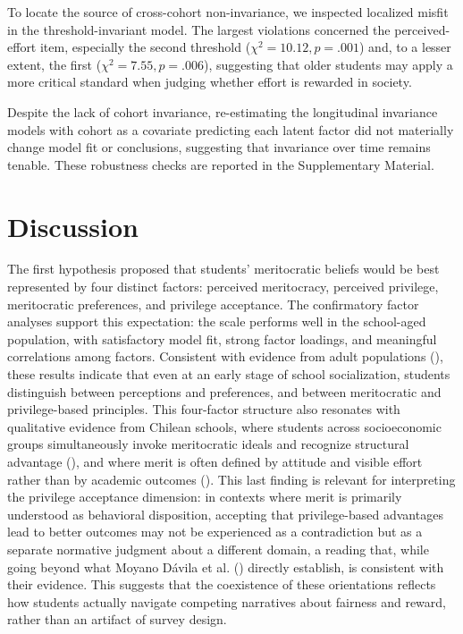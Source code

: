 \documentclass[
  13pt,
]{article}
\begin{document}
To locate the source of cross-cohort non-invariance, we inspected
localized misfit in the threshold-invariant model. The largest
violations concerned the perceived-effort item, especially the second
threshold (\(\chi^2=10.12, p=.001\)) and, to a lesser extent, the first
(\(\chi^2=7.55, p=.006\)), suggesting that older students may apply a
more critical standard when judging whether effort is rewarded in
society.

Despite the lack of cohort invariance, re-estimating the longitudinal
invariance models with cohort as a covariate predicting each latent
factor did not materially change model fit or conclusions, suggesting
that invariance over time remains tenable. These robustness checks are
reported in the Supplementary Material.

\section{Discussion}\label{discussion}

The first hypothesis proposed that students' meritocratic beliefs would
be best represented by four distinct factors: perceived meritocracy,
perceived privilege, meritocratic preferences, and privilege acceptance.
The confirmatory factor analyses support this expectation: the scale
performs well in the school-aged population, with satisfactory model
fit, strong factor loadings, and meaningful correlations among factors.
Consistent with evidence from adult populations
(),
these results indicate that even at an early stage of school
socialization, students distinguish between perceptions and preferences,
and between meritocratic and privilege-based principles. This
four-factor structure also resonates with qualitative evidence from
Chilean schools, where students across socioeconomic groups
simultaneously invoke meritocratic ideals and recognize structural
advantage (), and where merit is often defined by attitude and visible
effort rather than by academic outcomes
().
This last finding is relevant for interpreting the privilege acceptance
dimension: in contexts where merit is primarily understood as behavioral
disposition, accepting that privilege-based advantages lead to better
outcomes may not be experienced as a contradiction but as a separate
normative judgment about a different domain, a reading that, while going
beyond what Moyano Dávila et al.
() directly establish, is
consistent with their evidence. This suggests that the coexistence of
these orientations reflects how students actually navigate competing
narratives about fairness and reward, rather than an artifact of survey
design.
\end{document}
